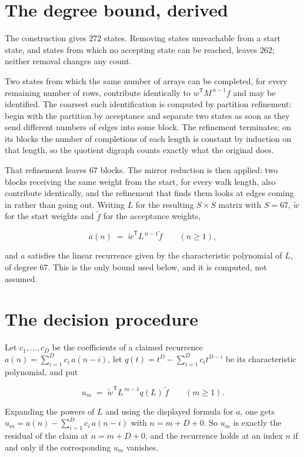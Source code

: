 \documentclass[11pt]{article}
\theoremstyle{definition}
\begin{document}
\section{The degree bound, derived}

The construction gives $272$ states. Removing states unreachable from a start state, and states from which no accepting state can be reached, leaves $262$; neither removal changes any count.

Two states from which the same number of arrays can be completed, for every remaining number of rows, contribute identically to $w^{\mathsf T}M^{\,n-1}f$ and may be identified. The coarsest such identification is computed by partition refinement: begin with the partition by acceptance and separate two states as soon as they send different numbers of edges into some block. The refinement terminates; on its blocks the number of completions of each length is constant by induction on that length, so the quotient digraph counts exactly what the original does.

That refinement leaves $67$ blocks. The mirror reduction is then applied: two blocks receiving the same weight from the start, for every walk length, also contribute identically, and the refinement that finds them looks at edges coming in rather than going out. Writing $L$ for the resulting $S \times S$ matrix with $S = 67$, $\tilde w$ for the start weights and $\tilde f$ for the acceptance weights,

\[a(n) \;=\; \tilde w^{\mathsf T} L^{\,n-1} \tilde f \qquad (n \ge 1),\]

and $a$ satisfies the linear recurrence given by the characteristic polynomial of $L$, of degree $67$. This is the only bound used below, and it is computed, not assumed.

\section{The decision procedure}

Let $c_1,\dots,c_D$ be the coefficients of a claimed recurrence $a(n) = \sum_{i=1}^{D} c_i\,a(n-i)$, let $q(t) = t^{D} - \sum_{i=1}^{D} c_i t^{D-i}$ be its characteristic polynomial, and put

\[u_m \;=\; \tilde w^{\mathsf T} L^{\,m-1} q(L)\,\tilde f \qquad (m \ge 1).\]

Expanding the powers of $L$ and using the displayed formula for $a$, one gets $u_m = a(n) - \sum_{i=1}^{D} c_i\,a(n-i)$ with $n = m + D + 0$. So $u_m$ is exactly the residual of the claim at $n = m + D + 0$, and the recurrence holds at an index $n$ if and only if the corresponding $u_m$ vanishes.
\end{document}
